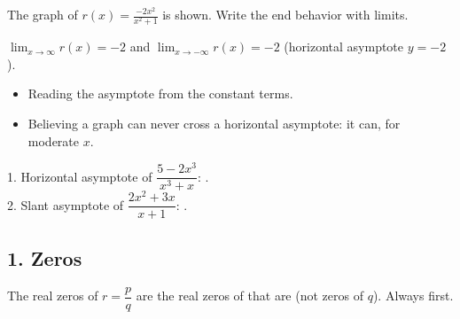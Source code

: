 \begin{center}
\end{center}
The graph of $r(x)=\frac{-2x^2}{x^2+1}$ is shown. Write the end behavior with limits.
\begin{workspace}[1.8cm]
$\lim_{x\to\infty}r(x)=-2$ and $\lim_{x\to-\infty}r(x)=-2$ (horizontal asymptote $y=-2$).
\end{workspace}

\begin{mistakes}
\begin{itemize}
\item Reading the asymptote from the constant terms.
\item Believing a graph can never cross a horizontal asymptote: it can, for moderate $x$.
\end{itemize}
\end{mistakes}

\begin{quickcheck}
1. Horizontal asymptote of $\dfrac{5-2x^3}{x^3+x}$: .\\
2. Slant asymptote of $\dfrac{2x^2+3x}{x+1}$: .
\end{quickcheck}


\subsection*{1. Zeros}
\begin{keyidea}
The real zeros of $r=\dfrac pq$ are the real zeros of  that are  (not zeros of $q$). Always  first.
\end{keyidea}

